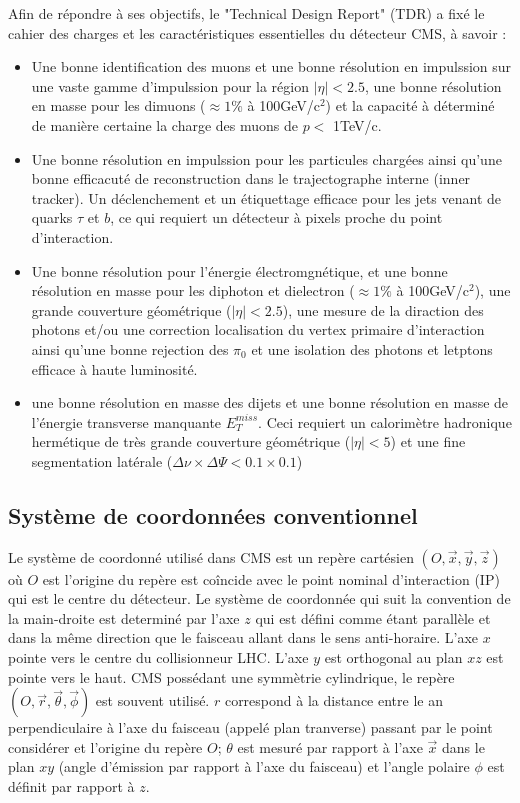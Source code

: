 Afin de répondre à ses objectifs, le "Technical Design Report" (TDR) \cite{Bayatian:922757} a fixé le cahier des charges et les caractéristiques essentielles du détecteur CMS, à savoir :
\begin{itemize}[label=$\bullet$]
	\item Une bonne identification des muons et une bonne résolution en impulssion sur une vaste gamme d'impulssion pour la région $|\eta|<2.5$, une bonne résolution en masse pour les dimuons ($\approx 1\%$ à 100GeV/c$^{2}$) et la capacité à déterminé de manière certaine la charge des muons de $p<$ 1TeV/c.
	\item Une bonne résolution en impulssion pour les particules chargées ainsi qu'une bonne efficacuté de reconstruction dans le trajectographe interne (inner tracker). Un déclenchement et un étiquettage efficace pour les jets venant de quarks $\tau$ et $b$, ce qui requiert un détecteur à pixels proche du point d'interaction.
	\item Une bonne résolution pour l'énergie électromgnétique, et une bonne résolution en masse pour les diphoton et dielectron  ($\approx 1\%$ à 100GeV/c$^{2}$), une grande couverture géométrique ($|\eta|<2.5$), une mesure de la diraction des photons et/ou une correction localisation du vertex primaire d'interaction ainsi qu'une bonne rejection des $\pi_{0}$ et une isolation des photons et letptons efficace à haute luminosité.
	\item une bonne résolution en masse des dijets et une bonne résolution en masse de l'énergie transverse manquante $E_{T}^{miss}$. Ceci requiert un calorimètre hadronique hermétique de très grande couverture géométrique ($|\eta|<5$) et une fine segmentation latérale ($\Delta\nu\times\Delta\Psi<0.1\times0.1$)
\end{itemize} 

\subsection{Système de coordonnées conventionnel}
Le système de coordonné utilisé dans CMS est un repère cartésien $\left(O,\vec{x},\vec{y},\vec{z}\right)$ où $O$ est l'origine du repère est coîncide avec le point nominal d'interaction (IP) qui est le centre du détecteur. Le système de coordonnée qui suit la convention de la main-droite est determiné par l'axe $z$ qui est défini comme étant parallèle et dans la même direction que le faisceau allant dans le sens anti-horaire. L'axe $x$ pointe vers le centre du collisionneur LHC. L'axe $y$ est orthogonal au plan $xz$ est pointe vers le haut. CMS possédant une symmètrie cylindrique, le repère $\left(O,\vec{r},\vec{\theta},\vec{\phi}\right)$ est souvent utilisé. $r$ correspond à la distance entre le an perpendiculaire à l'axe du faisceau (appelé plan tranverse) passant par le point considérer et l'origine du repère $O$; $\theta$ est mesuré par rapport à l'axe $\vec{x}$ dans le plan $xy$ (angle d'émission par rapport à l'axe du faisceau) et l'angle polaire $\phi$ est définit par rapport à $z$.

